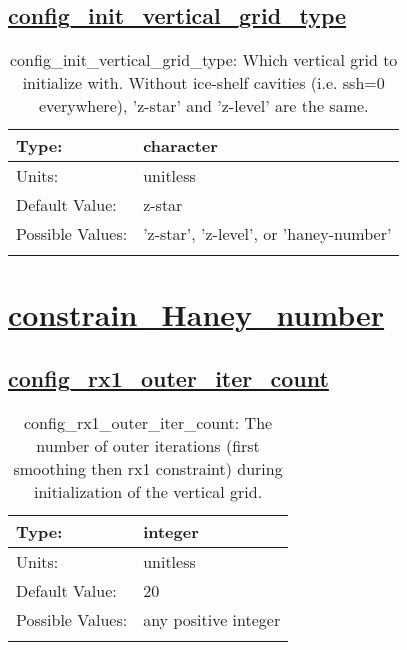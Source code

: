 \subsection[config\_init\_vertical\_grid\_type]{\hyperref[sec:nm_tab_init_vertical_grid]{config\_init\_vertical\_grid\_type}}
\label{subsec:nm_sec_config_init_vertical_grid_type}
\begin{center}
\begin{longtable}{| p{2.0in} || p{4.0in} |}
    \hline
    Type: & character \\
    \hline
    Units: & \si{unitless} \\
    \hline
    Default Value: & z-star \\
    \hline
    Possible Values: & 'z-star', 'z-level', or 'haney-number' \\
    \hline
    \caption{config\_init\_vertical\_grid\_type: Which vertical grid to initialize with.  Without ice-shelf cavities (i.e. ssh=0 everywhere), 'z-star' and 'z-level' are the same.}
\end{longtable}
\end{center}
\section[constrain\_Haney\_number]{\hyperref[sec:nm_tab_constrain_Haney_number]{constrain\_Haney\_number}}
\label{sec:nm_sec_constrain_Haney_number}
\subsection[config\_rx1\_outer\_iter\_count]{\hyperref[sec:nm_tab_constrain_Haney_number]{config\_rx1\_outer\_iter\_count}}
\label{subsec:nm_sec_config_rx1_outer_iter_count}
\begin{center}
\begin{longtable}{| p{2.0in} || p{4.0in} |}
    \hline
    Type: & integer \\
    \hline
    Units: & \si{unitless} \\
    \hline
    Default Value: & 20 \\
    \hline
    Possible Values: & any positive integer \\
    \hline
    \caption{config\_rx1\_outer\_iter\_count: The number of outer iterations (first smoothing then rx1 constraint) during initialization of the vertical grid.}
\end{longtable}
\end{center}
